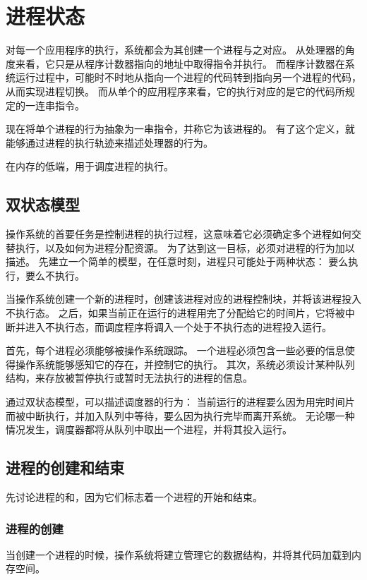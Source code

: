 
\section{进程状态}
{
    对每一个应用程序的执行，系统都会为其创建一个进程与之对应。
    从处理器的角度来看，它只是从程序计数器指向的地址中取得指令并执行。
    而程序计数器在系统运行过程中，可能时不时地从指向一个进程的代码转到指向另一个进程的代码，从而实现进程切换。
    而从单个的应用程序来看，它的执行对应的是它的代码所规定的一连串指令。

    现在将单个进程的行为抽象为一串指令，并称它为该进程的。
    有了这个定义，就能够通过进程的执行轨迹来描述处理器的行为。

    在内存的低端，用于调度进程的执行。

    \subsection{双状态模型}
    {
        操作系统的首要任务是控制进程的执行过程，这意味着它必须确定多个进程如何交替执行，以及如何为进程分配资源。
        为了达到这一目标，必须对进程的行为加以描述。
        先建立一个简单的模型，在任意时刻，进程只可能处于两种状态：
        要么执行，要么不执行。

        当操作系统创建一个新的进程时，创建该进程对应的进程控制块，并将该进程投入不执行态。
        之后，如果当前正在运行的进程用完了分配给它的时间片，它将被中断并进入不执行态，而调度程序将调入一个处于不执行态的进程投入运行。

        首先，每个进程必须能够被操作系统跟踪。
        一个进程必须包含一些必要的信息使得操作系统能够感知它的存在，并控制它的执行。
        其次，系统必须设计某种队列结构，来存放被暂停执行或暂时无法执行的进程的信息。

        通过双状态模型，可以描述调度器的行为：
        当前运行的进程要么因为用完时间片而被中断执行，并加入队列中等待，要么因为执行完毕而离开系统。
        无论哪一种情况发生，调度器都将从队列中取出一个进程，并将其投入运行。
    }

    \subsection{进程的创建和结束}
    {
        先讨论进程的和，因为它们标志着一个进程的开始和结束。

        \subsubsection{进程的创建}
        {
            当创建一个进程的时候，操作系统将建立管理它的数据结构，并将其代码加载到内存空间。

}}}
